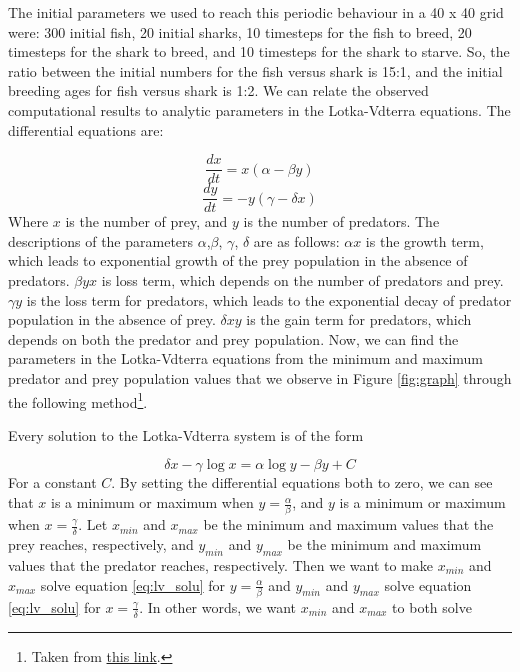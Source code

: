 \documentclass{article}
\begin{document}
The initial parameters we used to reach this periodic behaviour in a 40 x 40 grid were: 300 initial fish, 20 initial sharks, 10 timesteps for the fish to breed, 20 timesteps for the shark to breed, and 10 timesteps for the shark to starve. So, the ratio between the initial numbers for the fish versus shark is 15:1, and the initial breeding ages for fish versus shark is 1:2. We can relate the observed computational results to analytic parameters in the Lotka-Vdterra equations. The differential equations are:\par
\begin{equation}
\frac{dx}{dt} = x(\alpha - \beta y)
\end{equation}
\begin{equation}
\frac{dy}{dt} = -y(\gamma - \delta x)
\end{equation}
Where $x$ is the number of prey, and $y$ is the number of predators. The descriptions of the parameters $\alpha$,$\beta$, $\gamma$, $\delta$ are as follows: $\alpha x$ is the growth term, which leads to exponential growth of the prey population in the absence of predators. $\beta yx$ is loss term, which depends on the number of predators and prey. $\gamma y$ is the loss term for predators, which leads to the exponential decay of predator population in the absence of prey. $\delta xy$ is the gain term for predators, which depends on both the predator and prey population. Now, we can find the parameters in the Lotka-Vdterra equations from the minimum and maximum predator and prey population values that we observe in Figure \ref{fig:graph} through the following method\footnote{Taken from \href{http://math.stackexchange.com/q/1853938}{this link}.}.\par
Every solution to the Lotka-Vdterra system is of the form\par
\begin{equation}
\delta x - \gamma \log x = \alpha \log y - \beta y + C
\label{eq:lv_solu}
\end{equation}
\noindent For a constant $C$. By setting the differential equations both to zero, we can see that $x$ is a minimum or maximum when $y = \frac{\alpha}{\beta}$, and $y$ is a minimum or maximum when $x = \frac{\gamma}{\delta}$. Let $x_{min}$ and $x_{max}$ be the minimum and maximum values that the prey reaches, respectively, and $y_{min}$ and $y_{max}$ be the minimum and maximum values that the predator reaches, respectively. Then we want to make $x_{min}$ and $x_{max}$ solve equation \ref{eq:lv_solu} for $y = \frac{\alpha}{\beta}$ and $y_{min}$ and $y_{max}$ solve equation \ref{eq:lv_solu} for $x = \frac{\gamma}{\delta}$. In other words, we want $x_{min}$ and $x_{max}$ to both solve
\end{document}
